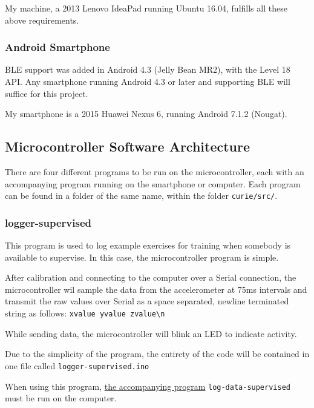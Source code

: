 \documentclass[a4paper]{article}
\begin{document}
My machine, a 2013 Lenovo IdeaPad running Ubuntu 16.04, fulfills all these above requirements.

\subsubsection{Android Smartphone}

BLE support was added in Android 4.3 (Jelly Bean MR2), with the Level 18 API.\cite{dsref6} Any smartphone running Android 4.3 or later and supporting BLE will suffice for this project.

My smartphone is a 2015 Huawei Nexus 6, running Android 7.1.2 (Nougat).

\newpage
\subsection{Microcontroller Software Architecture}%
\label{subsec:dc_msa}

There are four different programs to be run on the microcontroller, each with an accompanying program running on the smartphone or computer. Each program can be found in a folder of the same name, within the folder \lstinline{curie/src/}.

\subsubsection{logger-supervised}%
\label{subsubsec:dc_msa_loggersupervised}

This program is used to log example exercises for training when somebody is available to supervise. In this case, the microcontroller program is simple.

After calibration and connecting to the computer over a Serial connection, the microcontroller wil sample the data from the accelerometer at 75ms intervals and transmit the raw values over Serial as a space separated, newline terminated string as follows:
\lstinline|xvalue yvalue zvalue\n|

While sending data, the microcontroller will blink an LED to indicate activity.

Due to the simplicity of the program, the entirety of the code will be contained in one file called \lstinline{logger-supervised.ino}

When using this program, \hyperref[subsubsec:dc_csa_logsupervised]{the accompanying program} \lstinline{log-data-supervised} must be run on the computer.
\end{document}
